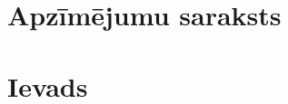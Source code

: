 \documentclass[12pt]{report}
\begin{document}

\setcounter{secnumdepth}{-1}

\clearpage


\tableofcontents
{}
\setcounter{page}{0}

\setcounter{secnumdepth}{-1}
\chapter{Apzīmējumu saraksts}



\setcounter{secnumdepth}{-1}
\chapter{Ievads}


\setcounter{secnumdepth}{2}
\setcounter{chapter}{0}

\chapter{\@nodone}\label{chap:chapter_1} 

\chapter{\@nodtwo}\label{chap:chapter_2} %




\chapter{\@nodthree}\label{chap:chapter_3} %


\chapter{\@nodfour}\label{chap:chapter_4} %


%



%
%
%
%
%
%
%
%
\setcounter{secnumdepth}{-1}
\end{document}
